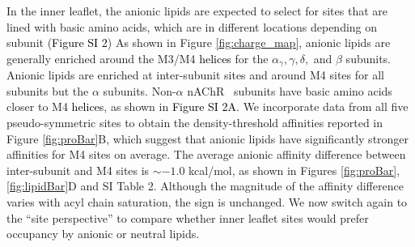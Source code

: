 \documentclass[%
 aip,
 amsmath,amssymb,
 preprint,%
]{revtex4-1}\usepackage{setspace}
\newcommand{\newaffinities}{density-threshold affinities}
\newcommand{\liam}[1]{\textcolor{black}{#1}}
\newcommand{\notsure}[1]{\textcolor{red}{#1}}
\newcommand{\nachr}{nAChR}
\begin{document}
In the inner leaflet, the anionic lipids are expected to select for sites that are lined with basic amino acids, which are in different locations depending on subunit (\liam{Figure SI 2})  As shown in Figure \ref{fig:charge_map}, anionic lipids are generally enriched around the M3/M4 \liam{helices} for the $\alpha_{\gamma}, \gamma,\delta,$ and $\beta$ subunits.  Anionic lipids are enriched at inter-subunit sites and around M4 sites for all subunits but the $\alpha$ subunits. Non-$\alpha$ \nachr~ subunits have basic amino acids closer to M4 \liam{helices}, as shown in \liam{Figure SI 2A}.  We incorporate data from all five pseudo-symmetric sites to obtain the \newaffinities{} reported in Figure \ref{fig:proBar}B, which suggest that anionic lipids have significantly stronger affinities for M4 sites on average. The average anionic affinity difference between inter-subunit and M4 sites is $\sim -1.0$ kcal/mol, as shown in Figures \ref{fig:proBar}, \ref{fig:lipidBar}D and SI Table 2. Although the magnitude of the affinity difference varies with acyl chain saturation, the sign is unchanged.     %
We now switch again to the ``site perspective'' to compare whether inner leaflet sites would prefer occupancy by anionic or neutral lipids. %
\end{document}
